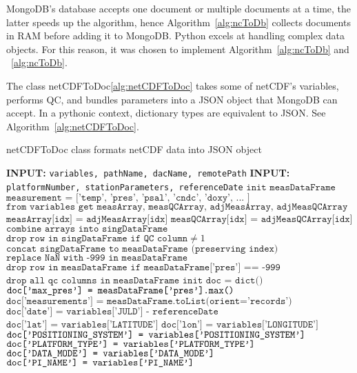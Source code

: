 MongoDB's database accepts one document or multiple documents at a time, the latter speeds up the algorithm, hence Algorithm~\ref{alg:ncToDb} collects documents in RAM before adding it to MongoDB. Python excels at handling complex data objects. For this reason, it was chosen to implement Algorithm~\ref{alg:ncToDb} and ~\ref{alg:ncToDb}.

The class netCDFToDoc\ref{alg:netCDFToDoc} takes some of netCDF's variables, performs QC, and bundles parameters into a JSON object that MongoDB can accept. In a pythonic context, dictionary types are equivalent to JSON. See Algorithm~\ref{alg:netCDFToDoc}.

\begin{algorithm}
\caption{netCDFToDoc class formats netCDF data into JSON object}\label{alg:netCDFToDoc}
\begin{algorithmic}[1]
\State \textbf{INPUT:} \texttt{variables, pathName, dacName, remotePath}
\State \textbf{INPUT:} \texttt{platformNumber, stationParameters, referenceDate}
\State $\texttt{init measDataFrame}$
\State $\texttt{measurement = ['temp', 'pres', 'psal', 'cndc', 'doxy', ... ]}$
\State $\texttt{from variables get measArray, measQCArray, adjMeasArray, adjMeasQCArray}$
\State $\texttt{measArray[idx] = adjMeasArray[idx]}$
\State $\texttt{measQCArray[idx] = adjMeasQCArray[idx]}$
\EndIf
\State $\texttt{combine arrays into singDataFrame}$
\EndLoop
\State $\texttt{drop row in singDataFrame if QC column} \neq 1$
\State $\texttt{concat singDataFrame to measDataFrame (preserving index)}$
\EndLoop
\State $\texttt{replace NaN with -999 in measDataFrame}$
\State $\texttt{drop row in measDataFrame if measDataFrame['pres'] == -999}$
\State $\texttt{drop all qc columns in measDataFrame}$
\State $\texttt{init doc = dict()}$
\State $\texttt{doc['max\textunderscore pres'] = measDataFrame['pres'].max()}$
\State $\texttt{doc['measurements'] = measDataFrame.toList(orient='records')}$
\State $\texttt{doc['date'] = variables['JULD'] - referenceDate}$
\State $\texttt{doc['lat'] = variables['LATITUDE']}$
\State $\texttt{doc['lon'] = variables['LONGITUDE']}$
\State $\texttt{doc['POSITIONING\textunderscore SYSTEM'] = variables['POSITIONING\textunderscore SYSTEM']}$
\State $\texttt{doc['PLATFORM\textunderscore TYPE'] = variables['PLATFORM\textunderscore TYPE']}$
\State $\texttt{doc['DATA\textunderscore MODE'] = variables['DATA\textunderscore MODE']}$
\State $\texttt{doc['PI\textunderscore NAME'] = variables['PI\textunderscore NAME']}$

\end{algorithmic}
\end{algorithm}

